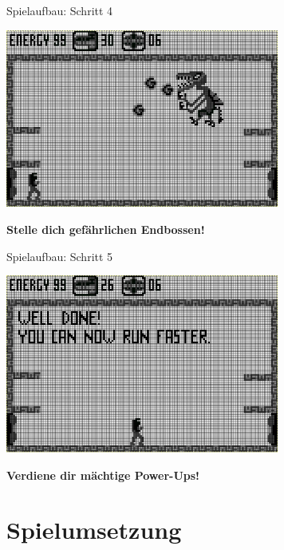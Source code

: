 \documentclass[fleqn]{beamer}
\begin{document}
    \begin{frame}{Spielaufbau: Schritt 4}
        \begin{center}
            \includegraphics[width=9cm]{Bilder/world6.png}
            
            \large \textbf{Stelle dich gefährlichen Endbossen!}
        \end{center}
    \end{frame}
    \begin{frame}{Spielaufbau: Schritt 5}
        \begin{center}
            \includegraphics[width=9cm]{Bilder/world5.png}
            
            \large \textbf{Verdiene dir mächtige Power-Ups!}
        \end{center}
    \end{frame}

    \section{Spielumsetzung}
    
\end{document}
